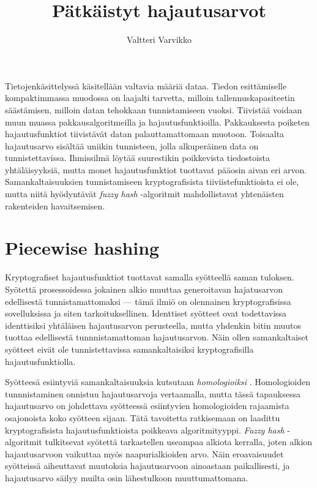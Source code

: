 \documentclass[12pt, a4paper]{article}
\title{Pätkäistyt hajautusarvot}
\author{Valtteri Varvikko}
\begin{document}
	\maketitle

	Tietojenkäsittelyssä käsitellään valtavia määriä dataa. Tiedon esittämiselle kompaktimmassa
	muodossa on laajalti tarvetta, milloin tallennuskapasiteetin säästämisen, milloin
	datan tehokkaan tunnistamiseen vuoksi. Tiivistää voidaan muun muassa pakkausalgoritmeilla ja
	hajautusfunktioilla. 
	Pakkauksesta poiketen hajautusfunktiot tiivistävät datan palauttamattomaan muotoon.
	Toisaalta hajautusarvo sisältää uniikin tunnisteen, jolla
	alkuperäinen data on tunnistettavissa. 
	Ihmissilmä löytää suurestikin poikkevista tiedostoista yhtäläisyyksiä,
	mutta monet hajautusfunktiot tuottavat pääosin aivan eri arvon.
	Samankaltaisuuksien tunnistamiseen kryptografisista tiiviistefunktioista ei ole,
	mutta niitä hyödyntävät \textit{fuzzy hash} -algoritmit mahdollistavat
	yhtenäisten rakenteiden havaitsemisen.

	\section*{Piecewise hashing}

	Kryptografiset hajautusfunktiot tuottavat samalla syötteellä saman tuloksen.
	Syötettä prosessoidessa jokainen alkio muuttaa generoitavan hajatusarvon
	edellisestä tunnistamattomaksi --- tämä ilmiö on olennainen kryptografisissa sovelluksissa
	ja siten tarkoituksellinen.
	Identtiset syötteet ovat todettavissa identtisiksi yhtäläisen hajautusarvon
	perusteella, mutta yhdenkin bitin muutos tuottaa edellisestä tunnnistamattoman
	hajautusarvon. Näin ollen samankaltaiset syötteet eivät ole tunnistettavissa
	samankaltaisiksi kryptografisilla hajautusfunktiolla.

	Syötteesä esiintyviä samankaltaisuuksia kutsutaan
	\textit{homologioiksi} \parencite{IDENT}. Homologioiden tunnnistaminen onnistuu hajautusarvoja
	vertaamalla, mutta tässä tapauksessa hajautusarvo on johdettava
	syötteessä esiintyvien homologioiden rajaamista osajonoista koko syötteen sijaan.
	Tätä tavoitetta ratkisemaan on laadittu kryptografisista hajautusfunktioista
	poikkeava algoritmityyppi. \textit{Fuzzy hash} -algoritmit tulkitsevat
	syötettä tarkastellen useampaa alkiota kerralla, joten alkion
	hajautusarvoon vaikuttaa myös naapurialkioiden arvo. Näin eroavaisuudet
	syötteissä aiheuttavat muutoksia hajautusarvoon ainoastaan paikallisesti,
	ja hajautusarvo säilyy muilta osin lähestulkoon muuttumattomana.
\end{document}
